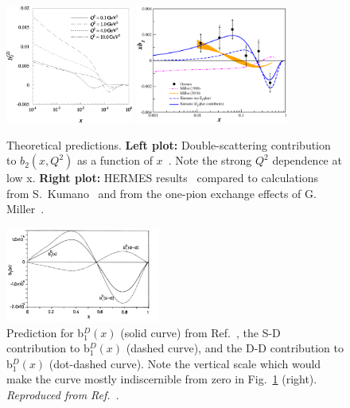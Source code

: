 \begin{figure}
\begin{center}
\includegraphics[width=0.3725\textwidth]{figs/bx.eps}
\hspace{0.3cm}
\includegraphics[width=0.45\textwidth]{figs/xb1_mstw_newmiller.eps}
\caption{\label{xb1_pred} Theoretical predictions. {\bf Left plot:} Double-scattering 
contribution to $b_2(x,Q^2)$ as a  function of $x$~\cite{Bora:1997pi}.  Note the strong $Q^2$ dependence at low x.
{\bf Right plot:} HERMES results~\cite{Airapetian:2005cb} compared to calculations 
from S.~Kumano~\cite{Kumano:2010vz} and from the one-pion exchange effects of 
G. Miller~\cite{Miller:1989nc,Miller_tmp}.}
\end{center}
\end{figure}

\begin{figure}
\begin{center}
\includegraphics[width=0.45\textwidth]{figs/khan_pervez.eps}
\caption{\label{KHAN} Prediction for b$_1^D(x)$ (solid curve) from Ref.~\cite{Khan:1991qk}, the S-D contribution to b$_1^D(x)$ (dashed curve), and the D-D contribution to b$_1^D(x)$ (dot-dashed curve).  Note the vertical scale which would make the curve mostly indiscernible from zero in Fig.~\ref{xb1_pred} (right). {\it Reproduced from Ref.~\cite{Khan:1991qk}}.
}
\end{center}
\end{figure}
